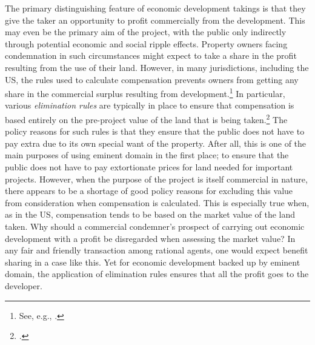 The primary distinguishing feature of economic development takings is that they give the taker an opportunity to profit commercially from the development. This may even be the primary aim of the project, with the public  only indirectly through potential economic and social ripple effects. Property owners facing condemnation in such circumstances might expect to take a share in the profit resulting from the use of their land. However, in many jurisdictions, including the US, the rules used to calculate compensation prevents owners from getting any share in the commercial surplus resulting from development.\footnote{See, e.g., \cite[965-966]{fennell04}.} In particular, various {\it elimination rules} are typically in place to ensure that compensation is based entirely on the pre-project value of the land that is being taken.\footcite[See][81]{freilich06} The policy reasons for such rules is that they ensure that the public does not have to pay extra due to its own special want of the property. After all, this is one of the main purposes of using eminent domain in the first place; to ensure that the public does not have to pay extortionate prices for land needed for important projects. However, when the purpose of the project is itself commercial in nature, there appears to be a shortage of good policy reasons for excluding this value from consideration when compensation is calculated. This is especially true when, as in the US, compensation tends to be based on the market value of the land taken. Why should a commercial condemner's prospect of carrying out economic development with a profit be disregarded when assessing the market value? In any fair and friendly transaction among rational agents, one would expect benefit sharing in a case like this. Yet for economic development backed up by eminent domain, the application of elimination rules ensures that all the profit goes to the developer. 


